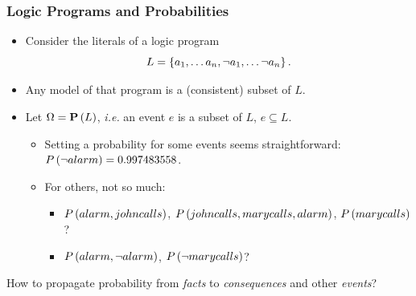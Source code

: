\documentclass[bigger]{beamer}
\begin{document}
\begin{frame}
    \frametitle{Logic Programs and Probabilities}
    \vfill
    \begin{itemize}
        \item Consider the literals of a logic program $$L = \set{a_1, \ldots a_n, \neg a_1, \ldots \neg a_n}.$$
        \item Any model of that program is a (consistent) subset of $L$.
        \item Let $\Omega = \mathbf{P}\del{L}$, \emph{i.e.} an \alert{event} $e$ is a subset of $L$, $e \subseteq L$.
              \begin{itemize}
                  \item Setting a probability for some events seems straightforward: $P\del{\neg alarm} = 0.997483558$.
                  \item For others, not so much:
                        \begin{itemize}
                            \item $P\del{alarm, johncalls}$, $P\del{johncalls, marycalls, alarm}$, $P\del{marycalls}$?
                            \item $P\del{alarm, \neg alarm}$, $P\del{\neg marycalls}$?
                        \end{itemize}
              \end{itemize}
    \end{itemize}
    \vfill
    \begin{center}
        How to \alert{propagate} probability from \emph{facts} to \emph{consequences} and other \emph{events}?
    \end{center}
\end{frame}
%
\end{document}

